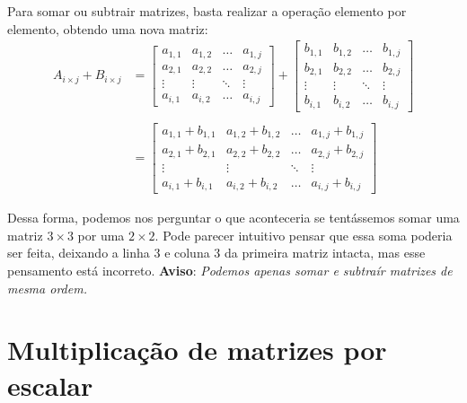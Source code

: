\documentclass[
  portuguese,
  letterpaper,
  DIV=11,
  numbers=noendperiod]{scrreport}
\begin{document}
Para somar ou subtrair matrizes, basta realizar a operação elemento por
elemento, obtendo uma nova matriz: \[
\begin{aligned}
    A_{i\times j}+B_{i\times j}&=
    \begin{bmatrix}
        a_{1,1} & a_{1,2} & \dots & a_{1,j} \\
        a_{2,1} & a_{2,2} & \dots & a_{2,j} \\
        \vdots  & \vdots & \ddots & \vdots \\
        a_{i,1} & a_{i,2} & \dots & a_{i,j}
    \end{bmatrix}
    +
    \begin{bmatrix}
        b_{1,1} & b_{1,2} & \dots & b_{1,j} \\
        b_{2,1} & b_{2,2} & \dots & b_{2,j} \\
        \vdots  & \vdots & \ddots & \vdots \\
        b_{i,1} & b_{i,2} & \dots & b_{i,j}
    \end{bmatrix}\\ \\
    &=
    \begin{bmatrix}
        a_{1,1} + b_{1,1} & a_{1,2} + b_{1,2} & \dots & a_{1,j} + b_{1,j} \\
        a_{2,1} + b_{2,1} & a_{2,2} + b_{2,2} & \dots & a_{2,j} + b_{2,j} \\
        \vdots  & \vdots & \ddots & \vdots \\
        a_{i,1} + b_{i,1} & a_{i,2} + b_{i,2} & \dots & a_{i,j} + b_{i,j}
    \end{bmatrix}
\end{aligned}
\]

Dessa forma, podemos nos perguntar o que aconteceria se tentássemos
somar uma matriz \(3\times 3\) por uma \(2 \times 2\). Pode parecer
intuitivo pensar que essa soma poderia ser feita, deixando a linha 3 e
coluna 3 da primeira matriz intacta, mas esse pensamento está incorreto.
\textbf{Aviso}: \emph{Podemos apenas somar e subtraír matrizes de mesma
ordem.}

\section{Multiplicação de matrizes por
escalar}\label{multiplicauxe7uxe3o-de-matrizes-por-escalar}
\end{document}
